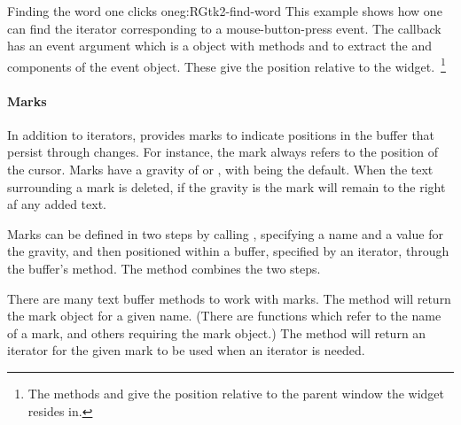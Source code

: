 \begin{example}{Finding the word one clicks on}{eg:RGtk2-find-word}
This example shows how one can find the iterator corresponding to a
mouse-button-press event. The callback has an event argument which is
a  object with methods
 and  to
extract the  and  components of the event
object. These give the position relative to the widget.~\footnote{The methods
 and
 give the position relative to the
parent window the widget resides in.}


\begin{Schunk}
\end{Schunk}
\end{example}


\paragraph{Marks}
In addition to iterators, \GTK\/ provides marks to indicate positions
in the buffer that persist through changes. For instance, the mark
 always refers to the position of the cursor. Marks have a
gravity of  or , with  being the
default. When the text surrounding a mark is deleted, if the gravity
is  the mark will remain to the right af any added
text. 


Marks can be defined in two steps by calling ,
specifying a name and a value for the gravity, and then 
positioned within a buffer, specified by an iterator, through the
buffer's  method. The
 method combines the two steps.

There are many text buffer methods to work with marks. The
 method will return the mark object for
a given name. (There are functions which refer to the name of a mark,
and others requiring the mark object.) The method  will return
an iterator for the given mark to be used when an iterator is needed.



